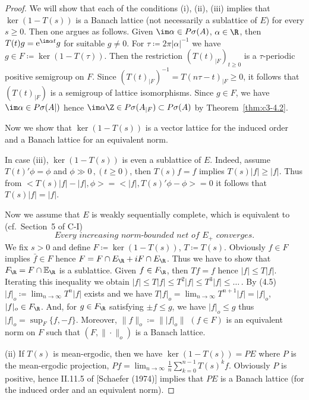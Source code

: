 \begin{proof}
	We will show that each of the conditions (i), (ii), (iii) implies that $\ker(1 - T(s))$ is a Banach lattice (not necessarily a sublattice of $E$) for every $s \geq 0$. 
	Then one argues as follows. Given $\im\alpha \in P\sigma(A)$, $\alpha \in \R $, then $T(t)g = \mathrm{e}^{\im\alpha t}g$ for suitable $g \neq 0$. 
	For $\tau \coloneqq  2\pi|\alpha|^{-1}$ we have $g \in F \coloneqq  \ker (1 - T(\tau))$. 
	Then the restriction $(T(t)_{|F})_{t \geq 0}$ is a $\tau$-periodic positive semigroup on $F$. 
	Since $\left(T(t)_{|F}\right)^{-1} = T(n\tau-t)_{|F} \geq 0$, it follows that $(T(t)_{|F})$ is a semigroup of lattice isomorphisms. 
	Since $g \in F$, we have $\im\alpha \in P\sigma(A|)$ hence $\im\alpha\Z \in P\sigma(A_{|F}) \subset P\sigma(A)$ by Theorem~\ref{thm:c3-4.2}.
	
	Now we show that $\ker (1 - T(s))$ is a vector lattice for the induced order and a Banach lattice for an equivalent norm.
	
	In case (iii), $\ker (1 - T(s))$ is even a sublattice of $E$. 
	Indeed, assume $T(t)'\phi = \phi$ and $\phi \gg 0\,, (t \geq 0)$, then $T(s)f = f$ implies $T(s)|f| \geq |f|$. 
	Thus from $<T(s)|f| - |f|,\phi> = <|f|,T(s)'\phi - \phi> = 0$ it follows that $T(s)|f| = |f|$.
	
	Now we assume that $E$ is weakly sequentially complete, which is equivalent to (cf.\ Section~5 of C-I)
	\begin{equation}\label{eq:c3-4.5}
	\textit{Every increasing norm-bounded net of $E_{+}$ converges}.
	\end{equation}
	We fix $s > 0$ and define $F \coloneqq  \ker (1 - T(s))$, $T \coloneqq  T(s)$. 
	Obviously $f \in F$ implies $\bar{f} \in F$ hence $F = F\cap E_{\R } + iF\cap E_{\R }$. 
	Thus we have to show that $F_{\R } = F\cap\mathbb{E}_{\R }$ is a sublattice. 
	Given $f \in F_{\R }$, then $Tf = f$ hence $|f| \leq T|f|$. 
	Iterating this inequality we obtain $|f| \leq T|f| \leq T^{2}|f| \leq T^{3}|f| \leq \dots\,.$ 
	By (4.5) $|f|_{o} \coloneqq  \lim_{n\to \infty} T^{n}|f|$ exists and we have $T|f|_{o} = \lim_{n\to \infty} T^{n+1}|f| = |f|_{o}$, \ie $|f|_{o} \in F_{\R }$.
	And, for $g \in F_{\R }$ satisfying $\pm f \leq g$, we have $|f|_{o} \leq g$ thus $|f|_{o} = \sup_{F}\{f,-f\}$. 
	Moreover, $\|f\|_{o} \coloneqq  \||f|_{o}\|$ $(f \in F)$ is an equivalent norm on $F$ such that $(F,\|\cdot\|_{o})$ is a Banach lattice.
	
	(ii) If $T(s)$ is mean-ergodic, then we have $\ker (1 - T(s)) = PE$ where $P$ is the mean-ergodic projection, \ie $Pf = \lim_{n\to \infty}\frac{1}{n}\sum_{k=0}^{n-1}T(s)^{k}f$.
	Obviously $P$ is positive, hence II.11.5 of [Schaefer (1974)] implies that $PE$ is a Banach lattice (for the induced order and an equivalent norm).
\end{proof}

